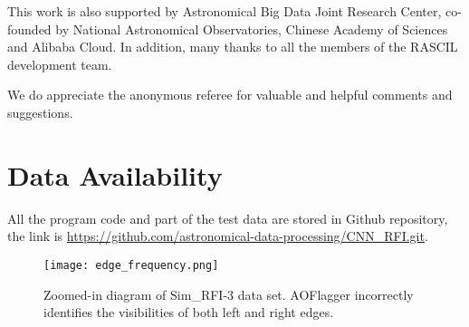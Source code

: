 \documentclass[usenatbib]{mnras}
\begin{document}
This work is also supported by Astronomical Big Data Joint Research Center, co-founded by National Astronomical Observatories, Chinese Academy of Sciences and Alibaba Cloud. In addition, many thanks to all the members of the RASCIL development team.

 We do appreciate the anonymous referee for valuable and helpful comments and suggestions.
 
\section{Data Availability}

All the program code and part of the test data are stored in Github repository, the link is \url{https://github.com/astronomical-data-processing/CNN_RFI.git}.


\begin{figure*}
\begin{center}
	\texttt{[image: edge\_frequency.png]}
\end{center}
    \caption{Zoomed-in diagram of Sim\_RFI-3 data set. AOFlagger incorrectly identifies the visibilities of both left and right edges.}
    \label{fig:edge}
\end{figure*}
\newpage











\end{document}
